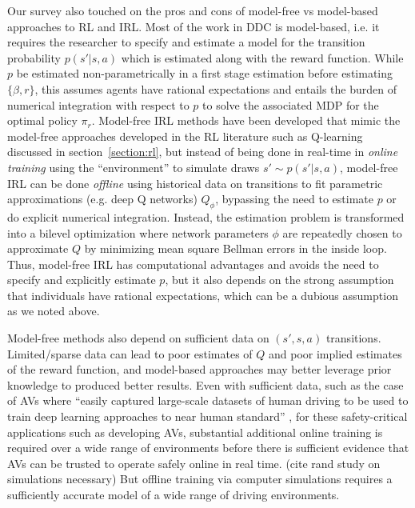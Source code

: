 Our survey also touched on the pros and cons of model-free vs model-based approaches to RL and IRL.
Most of the work in DDC is model-based, i.e. it requires the researcher to specify and estimate a model for the
transition probability $p(s'|s,a)$ which is estimated along with the reward function. While $p$ be estimated non-parametrically
in a first stage estimation before estimating $\{\beta,r\}$, this
assumes agents have rational expectations and entails the burden of numerical integration with respect
to $p$ to solve the associated MDP for the optimal policy $\pi_r$. Model-free IRL methods have been developed that mimic the model-free
approaches developed in the RL literature such as Q-learning discussed in section~\ref{section:rl}, but instead of being done
in real-time in {\it online training\/} using the ``environment'' to simulate draws $s' \sim p(s'|s,a)$, model-free IRL can be done {\it offline\/}
using historical data on transitions to fit parametric approximations (e.g. deep Q networks) $Q_\phi$, bypassing the need to estimate
$p$ or do explicit numerical integration. Instead, the estimation problem is transformed into a bilevel optimization where network
parameters $\phi$ are repeatedly chosen to approximate $Q$ by minimizing  mean square Bellman errors in the inside loop.
Thus, model-free IRL has computational advantages and avoids the need to specify and explicitly estimate $p$, but it also depends
on the strong assumption that individuals have rational expectations, which can be a dubious assumption as we noted above.

Model-free methods also depend on sufficient data on $(s',s,a)$ transitions. Limited/sparse
data can lead to poor estimates of $Q$ and poor implied estimates of the reward function, and model-based approaches
may better leverage prior knowledge to produced better results. Even with sufficient data, such as the case of AVs
where  ``easily captured large-scale datasets of human driving to be used to train deep learning approaches to near human standard''
\citep{mero:2022}, for these safety-critical applications such as developing AVs, substantial additional online training is required
over a wide range of environments before there is sufficient evidence that AVs can be trusted to operate safely online in real time.  (cite rand study on simulations necessary)
But offline training via computer simulations requires a sufficiently accurate model of a wide range of driving environments.
